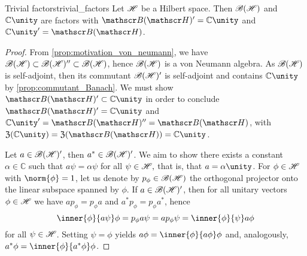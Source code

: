 \begin{proposition}{Trivial factors}{trivial_factors}
    Let \(\mathscr{H}\) be a Hilbert space. Then \(\mathscr{B}(\mathscr{H})\) and \(\mathbb{C} \unity\) are factors with \(\bounded(\hilbert)' = \mathbb{C} \unity\) and \(\mathbb{C} \unity' = \bounded(\hilbert)\).
\end{proposition}
\begin{proof}
    From \cref{prop:motivation_von_neumann}, we have \(\mathscr{B}(\mathscr{H}) \subset \mathscr{B}(\mathscr{H})'' \subset \mathscr{B}(\mathscr{H})\), hence \(\mathscr{B}(\mathscr{H})\) is a von Neumann algebra. As \(\mathscr{B}(\mathscr{H})\) is self-adjoint, then its commutant \(\mathscr{B}(\mathscr{H})'\) is self-adjoint and contains \(\mathbb{C} \unity\) by \cref{prop:commutant_Banach}. We must show \(\bounded(\hilbert)' \subset \mathbb{C} \unity\) in order to conclude \(\bounded(\hilbert)' = \mathbb{C} \unity\) and \(\mathbb{C} \unity' = \bounded(\hilbert)'' = \bounded(\hilbert)\), with \(\mathfrak{Z}(\mathbb{C}\unity) = \mathfrak{Z}(\bounded(\hilbert)) = \mathbb{C} \unity\).

    Let \(a \in \mathscr{B}(\mathscr{H})'\), then \(a^* \in \mathscr{B}(\mathscr{H})'\). We aim to show there exists a constant \(\alpha \in \mathbb{C}\) such that \(a\psi = \alpha \psi\) for all \(\psi \in \mathscr{H},\) that is, that \(a = \alpha \unity\). For \(\phi \in \mathscr{H}\) with \(\norm{\phi} = 1\), let us denote by \(p_{\phi} \in \mathscr{B}(\mathscr{H})\) the orthogonal projector onto the linear subspace spanned by \(\phi\). If \(a \in \mathscr{B}(\mathscr{H})'\), then for all unitary vectors \(\phi \in \mathscr{H}\) we have \(a p_\phi = p_\phi a\) and \(a^* p_\phi = p_\phi a^*\), hence
    \begin{equation*}
        \inner{\phi}{a \psi}\phi = p_\phi a\psi = ap_\phi \psi  = \inner{\phi}{\psi}a\phi
    \end{equation*}
    for all \(\psi \in \mathscr{H}\). Setting \(\psi = \phi\) yields \(a\phi = \inner{\phi}{a\phi}\phi\) and, analogously, \(a^*\phi = \inner{\phi}{a^*\phi}\phi\).


\end{proof}
